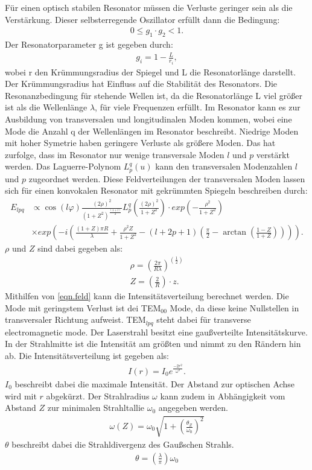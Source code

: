 Für einen optisch stabilen Resonator müssen die Verluste geringer sein als die Verstärkung.
Dieser selbsterregende Oszillator erfüllt dann die Bedingung:
\begin{align*}
  0\leq g_1\cdot g_2 <1.
\end{align*}
Der Resonatorparameter g ist gegeben durch:
\begin{align*}
  g_i=1-\frac{L}{r_i},
\end{align*}
wobei r den Krümmungsradius der Spiegel und L die Resonatorlänge darstellt.
Der Krümmungsradius hat Einfluss auf die Stabilität des Resonators.
%
Die Resonanzbedingung für stehende Wellen ist, da die Resonatorlänge L viel größer ist als die Wellenlänge $\lambda$, für viele Frequenzen erfüllt.
Im Resonator kann es zur Ausbildung von transversalen und longitudinalen Moden kommen, wobei eine Mode die Anzahl q der Wellenlängen im Resonator beschreibt.
Niedrige Moden mit hoher Symetrie haben geringere Verluste als größere Moden.
Das hat zurfolge, dass im Resonator nur wenige transversale Moden $l$ und $p$ verstärkt werden.
Das Laguerre-Polynom $L_p^q(u)$ kann den transversalen Modenzahlen $l$ und $p$ zugeordnet werden.
Diese Feldverteilungen der transversalen Moden lassen sich für einen konvokalen Resonator mit gekrümmten Spiegeln beschreiben durch:
%
\begin{align}
  E_{lpq} &\propto \cos(l \varphi)\frac{(2\rho)^2}{(1+Z^2)^{\frac{(1+l)}{2}}}
  L_p^q\left(\frac{(2\rho)^2}{1+Z^2}\right)\cdot exp \left(-\frac{\rho^2}{1+Z^2}\right)\\
  &\times exp \left(-i\left(\frac{(1+Z)\pi R}{\lambda}+\frac{\rho^2Z}{1+Z^2}-(l+2p+1)\left(\frac{\pi}{2}-
  \arctan\left(\frac{1-Z}{1+Z}\right)\right)\right)\right).
\label{eqn.feld}
\end{align}
$\rho$ und $Z$ sind dabei gegeben als:
\begin{align*}
  \rho=\left(\frac{2\pi}{R\lambda}\right)^{(\frac{1}{2})}\\
  Z=\left(\frac{2}{R}\right)\cdot z.
\end{align*}
Mithilfen von \ref{eqn.feld} kann die Intensitätsverteilung berechnet werden.
Die Mode mit geringstem Verlust ist dei TEM$_{00}$ Mode, da diese keine Nullstellen in transversaler Richtung aufweist.
TEM$_{lpq}$ steht dabei für transverse electromagnetic mode.
Der Laserstrahl besitzt eine gaußverteilte Intensitätskurve.
In der Strahlmitte ist die Intensität am größten und nimmt zu den Rändern hin ab.
Die Intensitätsverteilung ist gegeben als:
\begin{align*}
  I(r)=I_0e^{\frac{-2r^2}{\omega ^2}}.
\end{align*}
$I_0$ beschreibt dabei die maximale Intensität.
Der Abstand zur optischen Achse wird mit $r$ abgekürzt.
Der Strahlradius $\omega$ kann zudem in Abhängigkeit vom Abstand $Z$ zur minimalen Strahltallie $\omega_0$ angegeben werden.
\begin{align*}
  \omega(Z)=\omega_0\sqrt{1+\left(\frac{\theta_Z}{\omega_0}\right)^2}
\end{align*}
$\theta$ beschreibt dabei die Strahldivergenz des Gaußschen Strahls.
\begin{align*}
  \theta=\left(\frac{\lambda}{\pi}\right)\omega_0
\end{align*}
